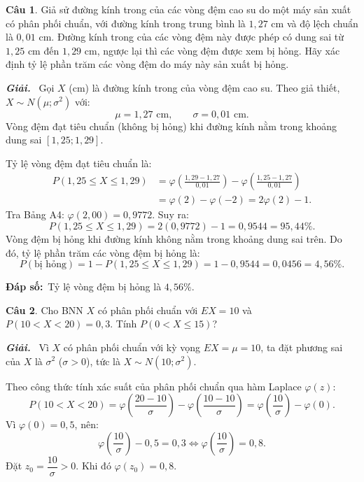 \documentclass[12pt,a4paper]{article}
\theoremstyle{definition}
\newtheorem{cau}{Câu}
\newcommand{\giai}{\noindent\textbf{\textit{Giải.}}\ }
\newcommand{\dapso}[1]{\noindent\textbf{Đáp số:}\ #1}
\begin{document}
\vspace{1.5em}
\begin{cau}
Giả sử đường kính trong của các vòng đệm cao su do một máy sản xuất có phân phối chuẩn, với đường kính trong trung bình là $1{,}27\text{ cm}$ và độ lệch chuẩn là $0{,}01\text{ cm}$. Đường kính trong của các vòng đệm này được phép có dung sai từ $1{,}25\text{ cm}$ đến $1{,}29\text{ cm}$, ngược lại thì các vòng đệm được xem bị hỏng. Hãy xác định tỷ lệ phần trăm các vòng đệm do máy này sản xuất bị hỏng.
\end{cau}

\giai
Gọi $X$ (cm) là đường kính trong của vòng đệm cao su. Theo giả thiết, $X \sim N(\mu; \sigma^2)$ với:
\[
\mu = 1{,}27\text{ cm}, \qquad \sigma = 0{,}01\text{ cm}.
\]
Vòng đệm đạt tiêu chuẩn (không bị hỏng) khi đường kính nằm trong khoảng dung sai $[1{,}25; 1{,}29]$.

Tỷ lệ vòng đệm đạt tiêu chuẩn là:
\begin{align*}
P(1{,}25 \le X \le 1{,}29) &= \varphi\left(\frac{1{,}29 - 1{,}27}{0{,}01}\right) - \varphi\left(\frac{1{,}25 - 1{,}27}{0{,}01}\right) \\
&= \varphi(2) - \varphi(-2) = 2\varphi(2) - 1.
\end{align*}
Tra Bảng A4: $\varphi(2{,}00) = 0{,}9772$. Suy ra:
\[
P(1{,}25 \le X \le 1{,}29) = 2(0{,}9772) - 1 = 0{,}9544 = 95{,}44\%.
\]
Vòng đệm bị hỏng khi đường kính không nằm trong khoảng dung sai trên. Do đó, tỷ lệ phần trăm các vòng đệm bị hỏng là:
\[
P(\text{bị hỏng}) = 1 - P(1{,}25 \le X \le 1{,}29) = 1 - 0{,}9544 = 0{,}0456 = 4{,}56\%.
\]

\dapso{Tỷ lệ vòng đệm bị hỏng là $4{,}56\%$.}

\vspace{1.5em}
\begin{cau}
Cho BNN $X$ có phân phối chuẩn với $EX = 10$ và $P(10 < X < 20) = 0{,}3$. Tính $P(0 < X \le 15)$?
\end{cau}

\giai
Vì $X$ có phân phối chuẩn với kỳ vọng $EX = \mu = 10$, ta đặt phương sai của $X$ là $\sigma^2$ ($\sigma > 0$), tức là $X \sim N(10; \sigma^2)$.

Theo công thức tính xác suất của phân phối chuẩn qua hàm Laplace $\varphi(z)$:
\[
P(10 < X < 20) = \varphi\left(\frac{20 - 10}{\sigma}\right) - \varphi\left(\frac{10 - 10}{\sigma}\right) = \varphi\left(\frac{10}{\sigma}\right) - \varphi(0).
\]
Vì $\varphi(0) = 0{,}5$, nên:
\[
\varphi\left(\frac{10}{\sigma}\right) - 0{,}5 = 0{,}3 \iff \varphi\left(\frac{10}{\sigma}\right) = 0{,}8.
\]
Đặt $z_0 = \dfrac{10}{\sigma} > 0$. Khi đó $\varphi(z_0) = 0{,}8$.
\end{document}
